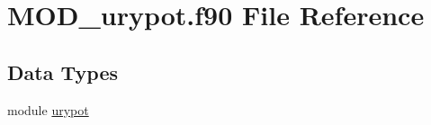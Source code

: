 \hypertarget{MOD__urypot_8f90}{\section{M\-O\-D\-\_\-urypot.\-f90 File Reference}
\label{MOD__urypot_8f90}
}
\subsection*{Data Types}
\begin{DoxyCompactItemize}
\item 
module \hyperlink{classurypot}{urypot}
\end{DoxyCompactItemize}
